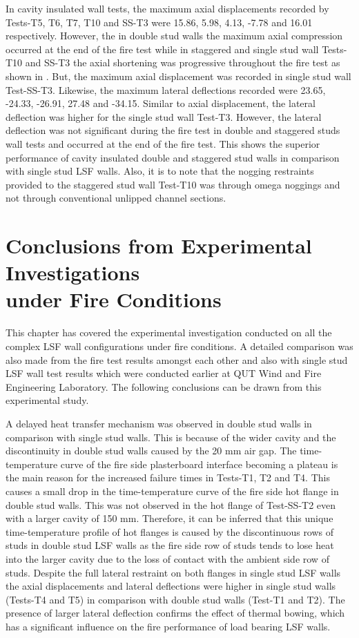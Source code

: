 In cavity insulated wall tests, the maximum axial displacements recorded by Tests-T5, T6, T7, T10 and SS-T3 were 15.86, 5.98, 4.13, -7.78 and 16.01 respectively. However, the in double stud walls the maximum axial compression occurred at the end of the fire test while in staggered and single stud wall Tests-T10 and SS-T3 the axial shortening was progressive throughout the fire test as shown in . But, the maximum axial displacement was recorded in single stud wall Test-SS-T3. Likewise, the maximum lateral deflections recorded were 23.65, -24.33, -26.91, 27.48 and -34.15. Similar to axial displacement, the lateral deflection was higher for the single stud wall Test-T3. However, the lateral deflection was not significant during the fire test in double and staggered studs wall tests and occurred at the end of the fire test. This shows the superior performance of cavity insulated double and staggered stud walls in comparison with single stud LSF walls. Also, it is to note that the nogging restraints provided to the staggered stud wall Test-T10 was through omega noggings and not through conventional unlipped channel sections.

\section[Conclusions from Experimental Investigations under Fire Conditions]{Conclusions from Experimental Investigations \\under Fire Conditions}

This chapter has covered the experimental investigation conducted on all the complex LSF wall configurations under fire conditions. A detailed comparison was also made from the fire test results amongst each other and also with single stud LSF wall test results which were conducted earlier at QUT Wind and Fire Engineering Laboratory. The following conclusions can be drawn from this experimental study.

A delayed heat transfer mechanism was observed in double stud walls in comparison with single stud walls. This is because of the wider cavity and the discontinuity in double stud walls caused by the 20 mm air gap. The time-temperature curve of the fire side plasterboard interface becoming a plateau is the main reason for the increased failure times in Tests-T1, T2 and T4. This causes a small drop in the time-temperature curve of the fire side hot flange in double stud walls. This was not observed in the hot flange of Test-SS-T2 even with a larger cavity of 150 mm. Therefore, it can be inferred that this unique time-temperature profile of hot flanges is caused by the discontinuous rows of studs in double stud LSF walls as the fire side row of studs tends to lose heat into the larger cavity due to the loss of contact with the ambient side row of studs. Despite the full lateral restraint on both flanges in single stud LSF walls the axial displacements and lateral deflections were higher in single stud walls (Tests-T4 and T5) in comparison with double stud walls (Test-T1 and T2). The presence of larger lateral deflection confirms the effect of thermal bowing, which has a significant influence on the fire performance of load bearing LSF walls.

